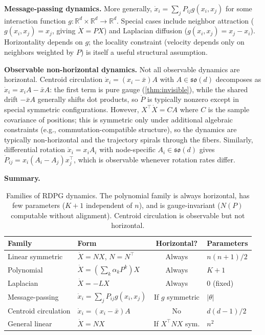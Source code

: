 \documentclass{article}
\newcommand{\RR}{\mathbb{R}}
\newcommand{\so}{\mathfrak{so}}
\theoremstyle{plain}
\theoremstyle{definition}
\theoremstyle{remark}
\begin{document}
\textbf{Message-passing dynamics.}
More generally, $\dot{x}_i = \sum_j P_{ij} g(x_i, x_j)$ for some interaction function $g: \RR^d \times \RR^d \to \RR^d$.
Special cases include neighbor attraction ($g(x_i, x_j) = x_j$, giving $\dot{X} = PX$) and Laplacian diffusion ($g(x_i, x_j) = x_j - x_i$).
Horizontality depends on $g$; the locality constraint (velocity depends only on neighbors weighted by $P$) is itself a useful structural assumption.

\textbf{Observable non-horizontal dynamics.}
Not all observable dynamics are horizontal.
Centroid circulation $\dot{x}_i = (x_i - \bar{x}) A$ with $A \in \so(d)$ decomposes as $\dot{x}_i = x_i A - \bar{x} A$: the first term is pure gauge (\cref{thm:invisible}), while the shared drift $-\bar{x} A$ generally shifts dot products, so $\dot{P}$ is typically nonzero except in special symmetric configurations.
However, $X^\top \dot{X} = CA$ where $C$ is the sample covariance of positions; this is symmetric only under additional algebraic constraints (e.g., commutation-compatible structure), so the dynamics are typically non-horizontal and the trajectory spirals through the fibers.
Similarly, differential rotation $\dot{x}_i = x_i A_i$ with node-specific $A_i \in \so(d)$ gives $\dot{P}_{ij} = x_i (A_i - A_j) x_j^\top$, which is observable whenever rotation rates differ.

\textbf{Summary.}

\begin{table}[ht]
\centering
\begin{tabular}{llcl}
\toprule
\textbf{Family} & \textbf{Form} & \textbf{Horizontal?} & \textbf{Parameters} \\
\midrule
Linear symmetric & $\dot{X} = NX$, $N = N^\top$ & Always & $n(n+1)/2$ \\
Polynomial & $\dot{X} = (\sum_k \alpha_k P^k) X$ & Always & $K + 1$ \\
Laplacian & $\dot{X} = -LX$ & Always & 0 (fixed) \\
Message-passing & $\dot{x}_i = \sum_j P_{ij} g(x_i, x_j)$ & If $g$ symmetric & $|\theta|$ \\
Centroid circulation & $\dot{x}_i = (x_i - \bar{x}) A$ & No & $d(d-1)/2$ \\
General linear & $\dot{X} = NX$ & If $X^\top NX$ sym. & $n^2$ \\
\bottomrule
\end{tabular}
\caption{Families of RDPG dynamics. The polynomial family is always horizontal, has few parameters ($K + 1$ independent of $n$), and is gauge-invariant ($N(P)$ computable without alignment). Centroid circulation is observable but not horizontal.}
\label{tab:dynamics-families}
\end{table}
\end{document}
